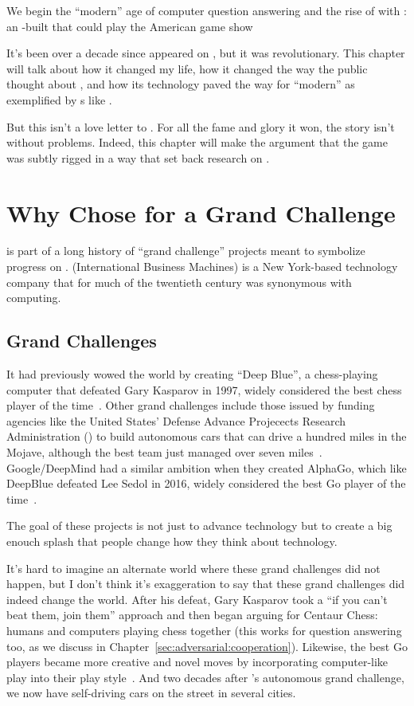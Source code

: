 
We begin the ``modern'' age of computer question answering and the rise of
 with \watson{}: an -built  that could play the
American game show \jeopardyf{}

It's been over a decade since \watson{} appeared on , but it was
revolutionary.  This chapter will talk about how it changed my life, how it
changed the way the public thought about , and how its technology
paved the way for ``modern''  as exemplified by \mm{}s like .

But this isn't a love letter to \watson{}.  For all the fame and glory it won, the
\watson{} story isn't without problems.  Indeed, this chapter will make the
argument that the game was subtly rigged in a way that set back research on
.

\section{Why  Chose \jeopardy{} for a Grand Challenge}

\watson{} is part of a long history of ``grand challenge'' projects meant to
symbolize progress on .
%
 (International Business Machines) is a New York-based technology
company that for much of the twentieth century was synonymous with computing.

\subsection{Grand Challenges}
\label{sec:grand-challenge}

It had previously wowed the world by creating ``Deep Blue'', a chess-playing
computer that defeated Gary Kasparov in 1997, widely considered the best chess
player of the time~\citep{hsu-02}.
%
Other  grand challenges include those issued by funding agencies like
the United States' Defense Advance Projecects Research Administration
() to build autonomous cars that can drive a hundred miles
in the Mojave, although the best team just managed over seven miles~\citep{patterson-05}.
%
Google/DeepMind had a similar ambition when they created AlphaGo, which like
DeepBlue defeated Lee Sedol in 2016, widely considered the best Go player of the time~\citep{koch-16}.

The goal of these projects is not just to advance technology but to create a
big enouch splash that people change how they think about technology.

It's hard to imagine an alternate world where these grand challenges did not
happen, but I don't think it's exaggeration to say that these grand challenges
did indeed change the world.  
%
After his defeat, Gary Kasparov took a ``if you can't beat them, join them''
approach and then began arguing for Centaur Chess: humans and computers
playing chess together (this works for question answering too, as we discuss
in Chapter~\ref{sec:adversarial:cooperation}).
%
Likewise, the best Go players became more creative and novel moves by 
incorporating computer-like play into their play style~\cite{shin-23}.
%
And two decades after 's autonomous grand challenge, we now have
self-driving cars on the street in several  cities.

